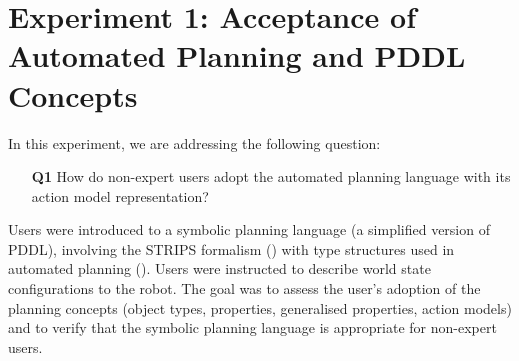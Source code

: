 
\section{Experiment 1: Acceptance of Automated Planning and PDDL Concepts}\label{sec:Exp1}

In this experiment, we are addressing the following question:

\begin{enumerate}
	\item[\textbf{Q1}] How do non-expert users adopt the automated planning language with its action model representation?
\end{enumerate}

Users were introduced to a symbolic planning language (a simplified version of PDDL), involving the STRIPS formalism (\cite{fikes1971strips}) with type structures used in automated planning ().
Users were instructed to describe world state configurations to the robot.
The goal was to assess the user's adoption of the planning concepts (object types, properties, generalised properties, action models) and to verify that the symbolic planning language is appropriate for non-expert users.

